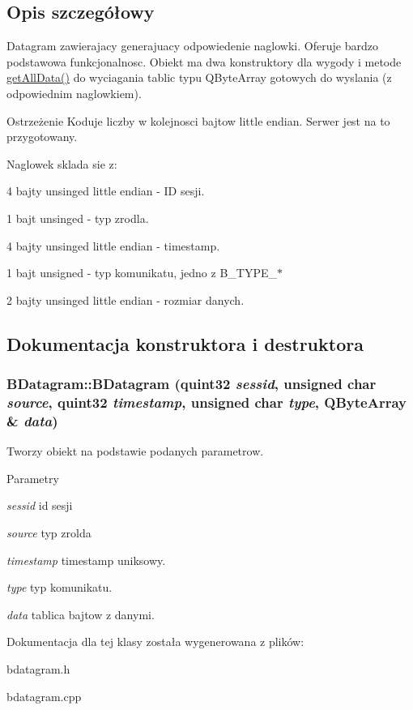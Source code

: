 \subsection{Opis szczegółowy}
Datagram zawierajacy generajuacy odpowiedenie naglowki. Oferuje bardzo podstawowa funkcjonalnosc. Obiekt ma dwa konstruktory dla wygody i metode \hyperlink{class_b_datagram_abf97808c5ae33d46feb4e2f1a920cb4f}{getAllData()} do wyciagania tablic typu QByteArray gotowych do wyslania (z odpowiednim naglowkiem).

\begin{DoxyWarning}{Ostrzeżenie}
Koduje liczby w kolejnosci bajtow little endian. Serwer jest na to przygotowany.
\end{DoxyWarning}
Naglowek sklada sie z: \begin{DoxyItemize}
\item 4 bajty unsinged little endian -\/ ID sesji. \item 1 bajt unsinged -\/ typ zrodla. \item 4 bajty unsinged little endian -\/ timestamp. \item 1 bajt unsigned -\/ typ komunikatu, jedno z B\_\-TYPE\_\-$\ast$ \item 2 bajty unsinged little endian -\/ rozmiar danych. \end{DoxyItemize}


\subsection{Dokumentacja konstruktora i destruktora}
\hypertarget{class_b_datagram_a6a687551e97a36b91c6a40a1c5a374ed}{
\subsubsection[{BDatagram}]{\setlength{\rightskip}{0pt plus 5cm}BDatagram::BDatagram (quint32 {\em sessid}, \/  unsigned char {\em source}, \/  quint32 {\em timestamp}, \/  unsigned char {\em type}, \/  QByteArray \& {\em data})}}
\label{class_b_datagram_a6a687551e97a36b91c6a40a1c5a374ed}


Tworzy obiekt na podstawie podanych parametrow. 
\begin{DoxyParams}{Parametry}
\item[{\em sessid}]id sesji \item[{\em source}]typ zrolda \item[{\em timestamp}]timestamp uniksowy. \item[{\em type}]typ komunikatu. \item[{\em data}]tablica bajtow z danymi. \end{DoxyParams}


Dokumentacja dla tej klasy została wygenerowana z plików:\begin{DoxyCompactItemize}
\item 
bdatagram.h\item 
bdatagram.cpp\end{DoxyCompactItemize}
